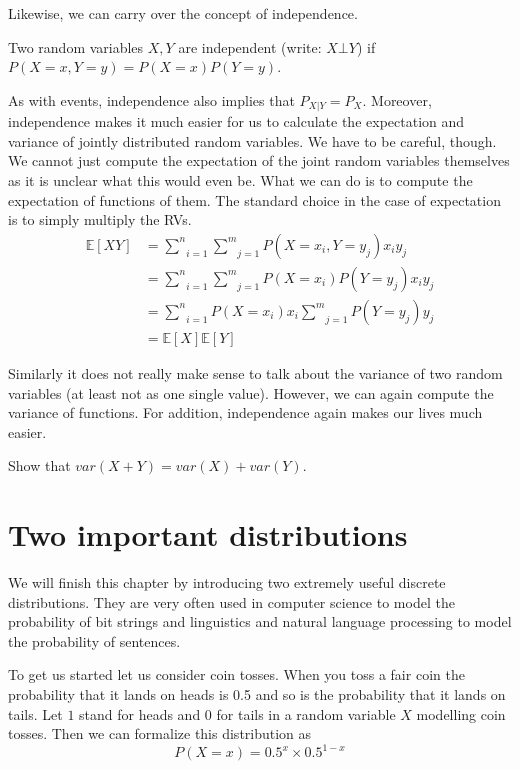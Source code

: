 \documentclass[a4paper,11pt,leqno]{report}
\newcommand{\E}{\mathbb{E}}
\begin{document}
Likewise, we can carry over the concept of independence.

\begin{Definition}
Two random variables $ X,Y $ are independent (write: $ X \bot Y $) if $ P(X=x, Y=y) = P(X=x)P(Y=y) $.
\end{Definition}

As with events, independence also implies that $ P_{X|Y} = P_{X} $. Moreover, independence makes it much easier for us
to calculate the expectation and variance of jointly distributed random variables. We have to be careful, though. We
cannot just compute the expectation of the joint random variables themselves as it is unclear what this would even be.
What we can do is to compute the expectation of functions of them. The standard choice in the case of expectation
is to simply multiply the RVs.
\begin{align}
\E[XY] &= \underset{i=1}{\overset{n}{\sum}}\underset{j=1}{\overset{m}{\sum}} P(X=x_{i},Y=y_{j}) x_{i}y_{j} \\
&= \underset{i=1}{\overset{n}{\sum}}\underset{j=1}{\overset{m}{\sum}} P(X=x_{i})P(Y=y_{j}) x_{i}y_{j} \\
&= \underset{i=1}{\overset{n}{\sum}}P(X=x_{i})x_{i} \underset{j=1}{\overset{m}{\sum}} P(Y=y_{j}) y_{j} \\
&= \E[X]\E[Y]
\end{align}

Similarly it does not really make sense to talk about the variance of two random variables (at least not as one single
value). However, we can again compute the variance of functions. For addition, independence again makes our lives
much easier.

\begin{Exercise}
Show that $ var(X + Y) = var(X) + var(Y) $.
\end{Exercise}



\section{Two important distributions}

We will finish this chapter by introducing two extremely useful discrete distributions. They are very often used in
computer science to model the probability of bit strings and linguistics and natural language processing to model
the probability of sentences. 

To get us started let us consider coin tosses. When you toss a fair coin the probability that it lands on heads is 0.5 and
so is the probability that it lands on tails. Let $ 1 $ stand for heads and $ 0 $ for tails in a random variable $ X $ 
modelling coin tosses. Then we can formalize this distribution as
\begin{equation}
P(X=x) = 0.5^{x}\times 0.5^{1-x}
\end{equation}
\end{document}
